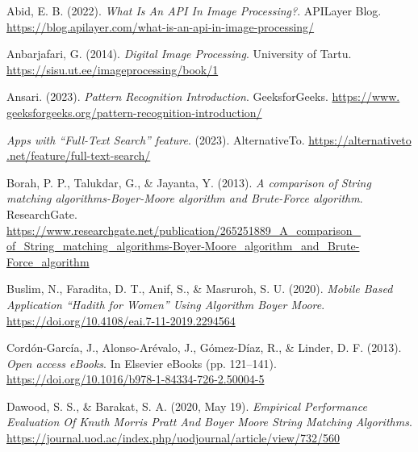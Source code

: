 {}

\begin{thebibliography}{21}

    Abid, E. B. (2022). \emph{What Is An API In Image Processing?}. APILayer Blog.
    \href{https://blog.apilayer.com/what-is-an-api-in-image-processing/}{https://blog.apilayer.com/what-is-an-api-in-image-processing/}

    Anbarjafari, G. (2014). \emph{Digital Image Processing}. University of Tartu.
    \href{https://sisu.ut.ee/imageprocessing/book/1}{https://sisu.ut.ee/imageprocessing/book/1}

    Ansari. (2023). \emph{Pattern Recognition \textbar{} Introduction}. GeeksforGeeks.
    \href{https://www.geeksforgeeks.org/pattern-recognition-introduction/}{https://www.\\geeksforgeeks.org/pattern-recognition-introduction/}

    \emph{Apps with “Full-Text Search” feature}. (2023). AlternativeTo.
    \href{https://alternativeto.net/feature/full-text-search/}{https://alternativeto\\.net/feature/full-text-search/}

    Borah, P. P., Talukdar, G., \& Jayanta, Y. (2013). \emph{A comparison of String matching
    algorithms-Boyer-Moore algorithm and Brute-Force algorithm}. ResearchGate.
    \href{https://www.researchgate.net/publication/265251889_A_comparison_of_String_matching_algorithms-Boyer-Moore_algorithm_and_Brute-Force_algorithm}{https://www.researchgate.net/publication/265251889\_A\_comparison\_\\of\_String\_matching\_algorithms-Boyer-Moore\_algorithm\_and\_Brute-Force\_algorithm}

    Buslim, N., Faradita, D. T., Anif, S., \& Masruroh, S. U. (2020). \emph{Mobile Based Application
    “Hadith for Women” Using Algorithm Boyer Moore}.
    \href{https://doi.org/10.4108/eai.7-11-2019.2294564}{https://doi.org/10.4108/eai.7-11-2019.2294564}

    Cordón-García, J., Alonso-Arévalo, J., Gómez-Díaz, R., \& Linder, D. F. (2013). \emph{Open access
    eBooks}. In Elsevier eBooks (pp. 121–141).
    \href{https://doi.org/10.1016/b978-1-84334-726-2.50004-5}{https://doi.org/10.1016/b978-1-84334-726-2.50004-5}

    Dawood, S. S., \& Barakat, S. A. (2020, May 19). \emph{Empirical Performance Evaluation Of Knuth
    Morris Pratt And Boyer Moore String Matching Algorithms}.
    \href{https://journal.uod.ac/index.php/uodjournal/article/view/732/560}{https://journal.uod.ac/index.php/uodjournal/article/view/732/560}


\end{thebibliography}
